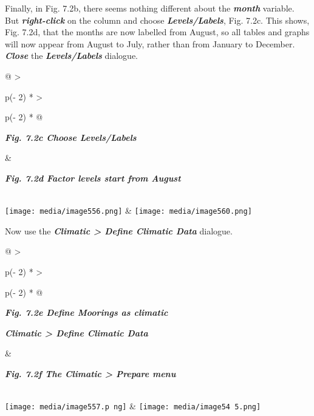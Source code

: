 \documentclass[
  letterpaper,
  DIV=11,
  numbers=noendperiod]{scrreprt}
\begin{document}
Finally, in Fig. 7.2b, there seems nothing different about the
\textbf{\emph{month}} variable. But \textbf{\emph{right-click}} on the
column and choose \textbf{\emph{Levels/Labels}}, Fig. 7.2c. This shows,
Fig. 7.2d, that the months are now labelled from August, so all tables
and graphs will now appear from August to July, rather than from January
to December. \textbf{\emph{Close}} the \textbf{\emph{Levels/Labels}}
dialogue.

\begin{longtable}[]{@{}
  >{\raggedright\arraybackslash}p{(\columnwidth - 2\tabcolsep) * }
  >{\raggedright\arraybackslash}p{(\columnwidth - 2\tabcolsep) * }@{}}
\toprule\noalign{}
\begin{minipage}[b]{\linewidth}\raggedright
\textbf{\emph{Fig. 7.2c Choose Levels/Labels}}
\end{minipage} & \begin{minipage}[b]{\linewidth}\raggedright
\textbf{\emph{Fig. 7.2d Factor levels start from August}}
\end{minipage} \\
\midrule\noalign{}
\endhead
\bottomrule\noalign{}
\endlastfoot
\texttt{[image: media/image556.png]} &
\texttt{[image: media/image560.png]} \\
\end{longtable}

Now use the \textbf{\emph{Climatic \textgreater{} Define Climatic Data}}
dialogue.

\begin{longtable}[]{@{}
  >{\raggedright\arraybackslash}p{(\columnwidth - 2\tabcolsep) * }
  >{\raggedright\arraybackslash}p{(\columnwidth - 2\tabcolsep) * }@{}}
\toprule\noalign{}
\begin{minipage}[b]{\linewidth}\raggedright
\textbf{\emph{Fig. 7.2e Define Moorings as climatic}}

\textbf{\emph{Climatic \textgreater{} Define Climatic Data}}
\end{minipage} & \begin{minipage}[b]{\linewidth}\raggedright
\textbf{\emph{Fig. 7.2f The Climatic \textgreater{} Prepare menu}}
\end{minipage} \\
\midrule\noalign{}
\endhead
\bottomrule\noalign{}
\endlastfoot
\texttt{[image: media/image557.p ng]}
&
\texttt{[image: media/image54 5.png]} \\
\end{longtable}
\end{document}
